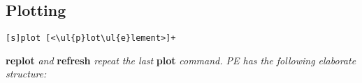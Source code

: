 \begin{comment}
\textit{Command line options include:}\
\begin{itemize}[label=-]
    \item V \quad \ul{version}
    \item h \quad \ul{help}
    \item p \quad \ul{persist} plot windows after close 
    \item d \quad \ul{default-settings}
    \item s \quad \ul{slow}: wait for font initialization
    \item e \quad execute given command
    \item c \quad call given following script
\end{itemize}
\end{comment}



\subsection*{Plotting} 

\begin{lstlisting}
[s]plot [<\ul{p}lot\ul{e}lement>]+
\end{lstlisting}
\textbf{replot} \textit{ and }\textbf{refresh}\textit{ repeat the last }\textbf{plot}\textit{ command. PE has the following elaborate structure:}

